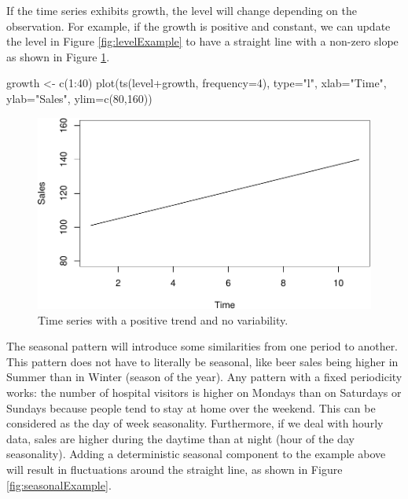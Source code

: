 \documentclass[
]{book}
\newenvironment{Shaded}{\begin{snugshade}}{\end{snugshade}}
\newcommand{\AttributeTok}[1]{\textcolor[rgb]{0.77,0.63,0.00}{#1}}
\newcommand{\DecValTok}[1]{\textcolor[rgb]{0.00,0.00,0.81}{#1}}
\newcommand{\FunctionTok}[1]{\textcolor[rgb]{0.00,0.00,0.00}{#1}}
\newcommand{\NormalTok}[1]{#1}
\newcommand{\OtherTok}[1]{\textcolor[rgb]{0.56,0.35,0.01}{#1}}
\newcommand{\SpecialCharTok}[1]{\textcolor[rgb]{0.00,0.00,0.00}{#1}}
\newcommand{\StringTok}[1]{\textcolor[rgb]{0.31,0.60,0.02}{#1}}
\theoremstyle{definition}
\theoremstyle{definition}
\theoremstyle{definition}
\theoremstyle{definition}
\theoremstyle{remark}
\begin{document}
If the time series exhibits growth, the level will change depending on the observation. For example, if the growth is positive and constant, we can update the level in Figure \ref{fig:levelExample} to have a straight line with a non-zero slope as shown in Figure \ref{fig:trendExample}.

\begin{Shaded}
\begin{Highlighting}[]
\NormalTok{growth }\OtherTok{\textless{}{-}} \FunctionTok{c}\NormalTok{(}\DecValTok{1}\SpecialCharTok{:}\DecValTok{40}\NormalTok{)}
\FunctionTok{plot}\NormalTok{(}\FunctionTok{ts}\NormalTok{(level}\SpecialCharTok{+}\NormalTok{growth, }\AttributeTok{frequency=}\DecValTok{4}\NormalTok{),}
     \AttributeTok{type=}\StringTok{"l"}\NormalTok{, }\AttributeTok{xlab=}\StringTok{"Time"}\NormalTok{, }\AttributeTok{ylab=}\StringTok{"Sales"}\NormalTok{, }\AttributeTok{ylim=}\FunctionTok{c}\NormalTok{(}\DecValTok{80}\NormalTok{,}\DecValTok{160}\NormalTok{))}
\end{Highlighting}
\end{Shaded}

\begin{figure}
\centering
\includegraphics{Svetunkov--2022----ADAM_files/figure-latex/trendExample-1.pdf}
\caption{\label{fig:trendExample}Time series with a positive trend and no variability.}
\end{figure}

The seasonal pattern will introduce some similarities from one period to another. This pattern does not have to literally be seasonal, like beer sales being higher in Summer than in Winter (season of the year). Any pattern with a fixed periodicity works: the number of hospital visitors is higher on Mondays than on Saturdays or Sundays because people tend to stay at home over the weekend. This can be considered as the day of week seasonality. Furthermore, if we deal with hourly data, sales are higher during the daytime than at night (hour of the day seasonality). Adding a deterministic seasonal component to the example above will result in fluctuations around the straight line, as shown in Figure \ref{fig:seasonalExample}.
\end{document}
